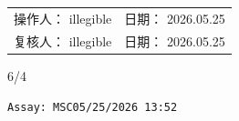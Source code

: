 \documentclass[UTF8,10pt,a4paper,fontset=fandol]{ctexart}
\newcommand{\fieldvalue}[1]{#1}
\newcommand{\handwritten}[1]{#1}
\begin{document}
\noindent
\begin{minipage}[t]{0.43\textwidth}
\centering
\fbox{\rule{0pt}{3.2cm}\rule{0.95\linewidth}{0pt}}
\end{minipage}
\hfill
\begin{minipage}[t]{0.43\textwidth}
\centering
\fbox{\rule{0pt}{3.2cm}\rule{0.95\linewidth}{0pt}}
\end{minipage}

\vspace{2em}

\noindent
\begin{minipage}[t]{0.43\textwidth}
\centering
\fbox{\rule{0pt}{3.2cm}\rule{0.95\linewidth}{0pt}}
\end{minipage}
\hfill
\begin{minipage}[t]{0.43\textwidth}
\centering
\fbox{\rule{0pt}{3.2cm}\rule{0.95\linewidth}{0pt}}
\end{minipage}

\vfill

\noindent
\begin{tabularx}{\textwidth}{@{}X X@{}}
操作人：%
\fieldvalue{\handwritten{illegible}}
&
日期：%
\fieldvalue{\handwritten{2026.05.25}}
\\[1em]
复核人：%
\fieldvalue{\handwritten{illegible}}
&
日期：%
\fieldvalue{\handwritten{2026.05.25}}
\end{tabularx}

\vspace{2em}

\noindent
\handwritten{6/4}

\newpage

\noindent\texttt{Assay: MSC}\hfill\texttt{05/25/2026 13:52}

\vspace{0.5em}
\end{document}
